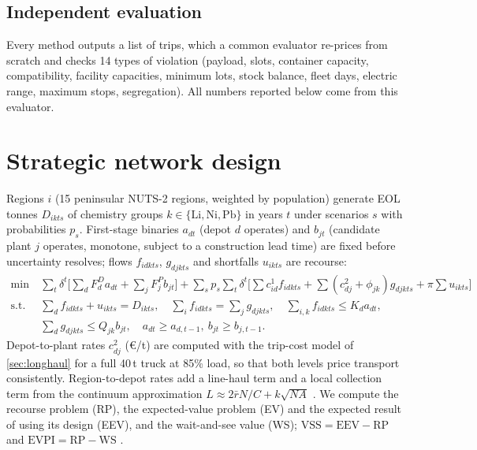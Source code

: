 \documentclass[11pt,a4paper]{article}
\begin{document}
\subsection{Independent evaluation}\label{sec:eval}
Every method outputs a list of trips, which a common evaluator re-prices from scratch and checks 14 types of violation (payload, slots, container capacity, compatibility, facility capacities, minimum lots, stock balance, fleet days, electric range, maximum stops, segregation). All numbers reported below come from this evaluator.

\section{Strategic network design}
\label{sec:strategic}
Regions $i$ (15 peninsular NUTS-2 regions, weighted by population) generate EOL tonnes $D_{ikts}$ of chemistry groups $k\in\{\text{Li},\text{Ni},\text{Pb}\}$ in years $t$ under scenarios $s$ with probabilities $p_s$. First-stage binaries $a_{dt}$ (depot $d$ operates) and $b_{jt}$ (candidate plant $j$ operates, monotone, subject to a construction lead time) are fixed before uncertainty resolves; flows $f_{idkts}$, $g_{djkts}$ and shortfalls $u_{ikts}$ are recourse:
\begin{align}
\min\ &\sum_t\delta^t\Big[\sum_d F^D_d a_{dt}+\sum_j F^P_j b_{jt}\Big]+\sum_s p_s\sum_t\delta^t\Big[\sum c^1_{id}f_{idkts}+\sum(c^2_{dj}+\phi_{jk})g_{djkts}+\pi\sum u_{ikts}\Big]\\
\text{s.t. }&\textstyle\sum_d f_{idkts}+u_{ikts}=D_{ikts},\quad \sum_i f_{idkts}=\sum_j g_{djkts},\quad \sum_{i,k}f_{idkts}\le K_d a_{dt},\\
&\textstyle\sum_d g_{djkts}\le Q_{jk}b_{jt},\quad a_{dt}\ge a_{d,t-1},\ b_{jt}\ge b_{j,t-1}.
\end{align}
Depot-to-plant rates $c^2_{dj}$ (\euro/t) are computed with the trip-cost model of \cref{sec:longhaul} for a full 40\,t truck at 85\% load, so that both levels price transport consistently. Region-to-depot rates add a line-haul term and a local collection term from the continuum approximation $L\approx 2\bar r N/C+k\sqrt{NA}$ \citep{beardwood1959,daganzo1984}. We compute the recourse problem (RP), the expected-value problem (EV) and the expected result of using its design (EEV), and the wait-and-see value (WS); $\mathrm{VSS}=\mathrm{EEV}-\mathrm{RP}$ and $\mathrm{EVPI}=\mathrm{RP}-\mathrm{WS}$ \citep{birge2011}.
\end{document}
